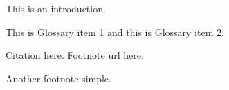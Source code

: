 
This is an introduction.

This is \gls{Glossary item 1} and this is \gls{Glossary item 2}.

Citation here\citep{Li2019}. Footnote url here.

Another footnote simple.
